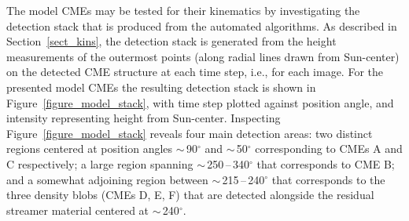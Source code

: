 \documentclass[preprint2]{aastex}
\begin{document}
The model CMEs may be tested for their kinematics by investigating the detection stack that is produced from the automated algorithms. As described in Section~\ref{sect_kins}, the detection stack is generated from the height measurements of the outermost points (along radial lines drawn from Sun-center) on the detected CME structure at each time step, i.e., for each image. For the presented model CMEs the resulting detection stack is shown in Figure~\ref{figure_model_stack}, with time step plotted against position angle, and intensity representing height from Sun-center. Inspecting Figure~\ref{figure_model_stack} reveals four main detection areas: two distinct regions centered at position angles $\sim$\,90$^{\circ}$ and $\sim$\,50$^{\circ}$ corresponding to CMEs A and C respectively; a large region spanning $\sim$\,250\,--\,340$^{\circ}$ that corresponds to CME B; and a somewhat adjoining region between $\sim$\,215\,--\,240$^{\circ}$ that corresponds to the three density blobs (CMEs D, E, F) that are detected alongside the residual streamer material centered at $\sim$\,240$^{\circ}$. %
\end{document}
